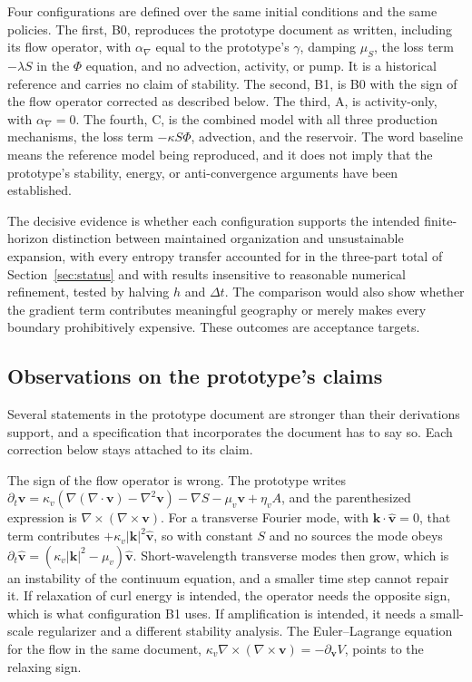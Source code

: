 \documentclass[11pt]{article}
\begin{document}
Four configurations are defined over the same initial conditions and the same policies. The first, B0, reproduces the prototype document as written, including its flow operator, with $\alpha_\nabla$ equal to the prototype's $\gamma$, damping $\mu_S$, the loss term $-\lambda S$ in the $\Phi$ equation, and no advection, activity, or pump. It is a historical reference and carries no claim of stability. The second, B1, is B0 with the sign of the flow operator corrected as described below. The third, A, is activity-only, with $\alpha_\nabla=0$. The fourth, C, is the combined model with all three production mechanisms, the loss term $-\kappa S\Phi$, advection, and the reservoir. The word baseline means the reference model being reproduced, and it does not imply that the prototype's stability, energy, or anti-convergence arguments have been established.

The decisive evidence is whether each configuration supports the intended finite-horizon distinction between maintained organization and unsustainable expansion, with every entropy transfer accounted for in the three-part total of Section~\ref{sec:status} and with results insensitive to reasonable numerical refinement, tested by halving $h$ and $\Delta t$. The comparison would also show whether the gradient term contributes meaningful geography or merely makes every boundary prohibitively expensive. These outcomes are acceptance targets.

\subsection{Observations on the prototype's claims}

Several statements in the prototype document are stronger than their derivations support, and a specification that incorporates the document has to say so. Each correction below stays attached to its claim.

The sign of the flow operator is wrong. The prototype writes $\partial_t\mathbf{v}=\kappa_v(\nabla(\nabla\!\cdot\mathbf{v})-\nabla^2\mathbf{v})-\nabla S-\mu_v\mathbf{v}+\eta_vA$, and the parenthesized expression is $\nabla\times(\nabla\times\mathbf{v})$. For a transverse Fourier mode, with $\mathbf{k}\cdot\hat{\mathbf{v}}=0$, that term contributes $+\kappa_v|\mathbf{k}|^2\hat{\mathbf{v}}$, so with constant $S$ and no sources the mode obeys $\partial_t\hat{\mathbf{v}}=(\kappa_v|\mathbf{k}|^2-\mu_v)\hat{\mathbf{v}}$. Short-wavelength transverse modes then grow, which is an instability of the continuum equation, and a smaller time step cannot repair it. If relaxation of curl energy is intended, the operator needs the opposite sign, which is what configuration B1 uses. If amplification is intended, it needs a small-scale regularizer and a different stability analysis. The Euler--Lagrange equation for the flow in the same document, $\kappa_v\nabla\times(\nabla\times\mathbf{v})=-\partial_{\mathbf{v}}V$, points to the relaxing sign.
\end{document}
